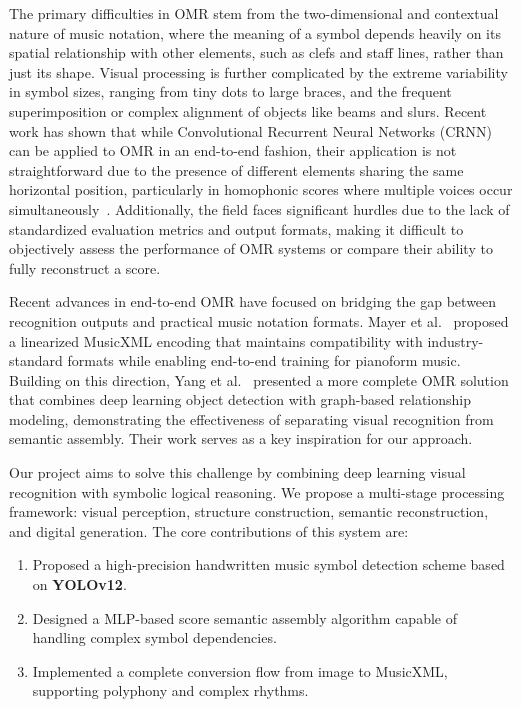 \documentclass[twocolumn, a4paper, 10pt]{article}
\begin{document}
The primary difficulties in OMR stem from the two-dimensional and contextual nature of music notation, where the meaning of a symbol depends heavily on its spatial relationship with other elements, such as clefs and staff lines, rather than just its shape. Visual processing is further complicated by the extreme variability in symbol sizes, ranging from tiny dots to large braces, and the frequent superimposition or complex alignment of objects like beams and slurs. Recent work has shown that while Convolutional Recurrent Neural Networks (CRNN) can be applied to OMR in an end-to-end fashion, their application is not straightforward due to the presence of different elements sharing the same horizontal position, particularly in homophonic scores where multiple voices occur simultaneously~\cite{Alfaro_Contreras_2023}. Additionally, the field faces significant hurdles due to the lack of standardized evaluation metrics and output formats, making it difficult to objectively assess the performance of OMR systems or compare their ability to fully reconstruct a score.

Recent advances in end-to-end OMR have focused on bridging the gap between recognition outputs and practical music notation formats. Mayer et al.~\cite{Mayer_2024} proposed a linearized MusicXML encoding that maintains compatibility with industry-standard formats while enabling end-to-end training for pianoform music. Building on this direction, Yang et al.~\cite{yang2024completeomrsolution} presented a more complete OMR solution that combines deep learning object detection with graph-based relationship modeling, demonstrating the effectiveness of separating visual recognition from semantic assembly. Their work serves as a key inspiration for our approach.

Our project aims to solve this challenge by combining deep learning visual recognition with symbolic logical reasoning. We propose a multi-stage processing framework: visual perception, structure construction, semantic reconstruction, and digital generation. The core contributions of this system are:
\begin{enumerate}
    \item Proposed a high-precision handwritten music symbol detection scheme based on \textbf{YOLOv12}.
    \item Designed a MLP-based score semantic assembly algorithm capable of handling complex symbol dependencies.
    \item Implemented a complete conversion flow from image to MusicXML, supporting polyphony and complex rhythms.
\end{enumerate}
\end{document}
